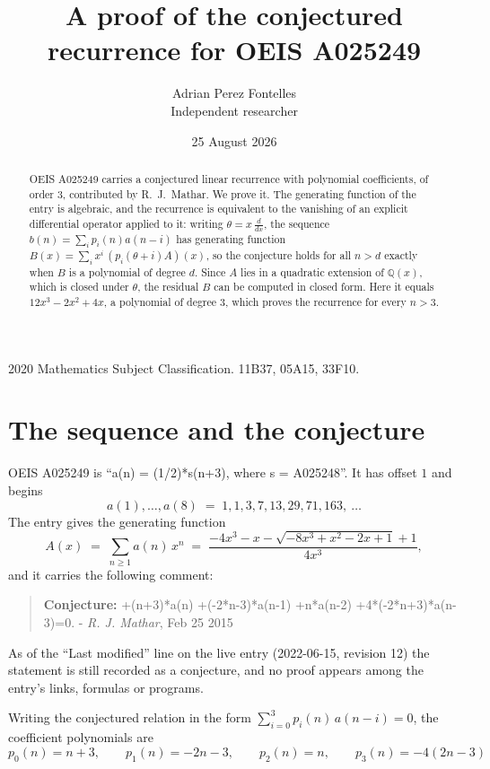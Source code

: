 \documentclass[11pt,a4paper]{article}
\title{A proof of the conjectured recurrence for OEIS A025249}
\author{Adrian Perez Fontelles\\ \small Independent researcher}
\date{25 August 2026}
\theoremstyle{plain}
\theoremstyle{definition}
\begin{document}
\maketitle

\begin{abstract}
OEIS A025249 carries a conjectured linear recurrence with polynomial coefficients, of
order 3, contributed by R.~J.~Mathar. We prove it. The generating function of the
entry is algebraic, and the recurrence is equivalent to the vanishing of an explicit
differential operator applied to it: writing $\theta=x\,\frac{d}{dx}$, the sequence
$b(n)=\sum_{i}p_{i}(n)a(n-i)$ has generating function
$B(x)=\sum_{i}x^{i}\,(p_{i}(\theta+i)A)(x)$, so the conjecture holds for all $n>d$ exactly
when $B$ is a polynomial of degree $d$. Since $A$ lies in a quadratic extension of
$\mathbb{Q}(x)$, which is closed under $\theta$, the residual $B$ can be computed in
closed form. Here it equals $12 x^{3} - 2 x^{2} + 4 x$, a polynomial of degree $3$, which proves
the recurrence for every $n>3$.
\end{abstract}

\noindent\small 2020 Mathematics Subject Classification. 11B37, 05A15, 33F10.\normalsize

\section{The sequence and the conjecture}

OEIS A025249 is ``a(n) = (1/2)*s(n+3), where s = A025248''. It has offset $1$ and begins
\[
a(1),\dots,a(8)\;=\;1, 1, 3, 7, 13, 29, 71, 163,\ \dots
\]
The entry gives the generating function
\begin{equation}\label{eq:gf}
A(x)\;=\;\sum_{n\ge 1} a(n)\,x^{n}\;=\;\frac{- 4 x^{3} - x - \sqrt{- 8 x^{3} + x^{2} - 2 x + 1} + 1}{4 x^{3}} ,
\end{equation}
and it carries the following comment:
\begin{quote}\small
\textbf{Conjecture:} +(n+3)*a(n) +(-2*n-3)*a(n-1) +n*a(n-2) +4*(-2*n+3)*a(n-3)=0. - \emph{R. J. Mathar}, Feb 25 2015
\end{quote}
As of the ``Last modified'' line on the live entry (2022-06-15, revision 12) the
statement is still recorded as a conjecture, and no proof appears among the entry's links,
formulas or programs.

Writing the conjectured relation in the form $\sum_{i=0}^{3}p_{i}(n)\,a(n-i)=0$,
the coefficient polynomials are
\[
p_{0}(n)=n + 3,\qquad p_{1}(n)=- 2 n - 3,\qquad p_{2}(n)=n,\qquad p_{3}(n)=- 4 \left(2 n - 3\right)
\]
\end{document}
